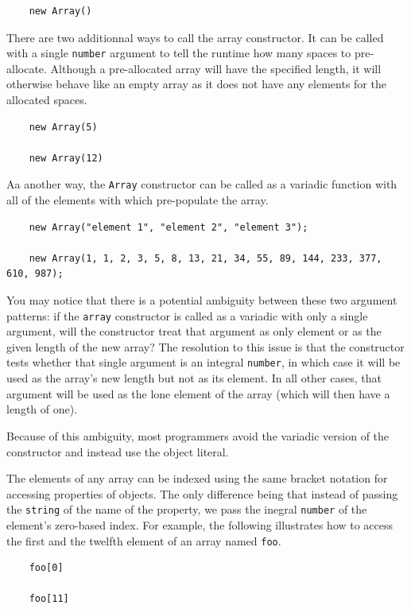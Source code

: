 \documentclass[11pt,letter]{book}
\begin{document}
    \begin{verbatim}
    new Array()
    \end{verbatim}
    
    There are two additionnal ways to call the array constructor. It can be called with a single 
    \texttt{number} argument to tell the runtime how many spaces to pre-allocate. Although a 
    pre-allocated array will have the specified length, it will otherwise behave like an empty array
    as it does not have any elements for the allocated spaces.
    
    \begin{verbatim}
    new Array(5)
    
    new Array(12)
    \end{verbatim}
    
    Aa another way, the \texttt{Array} constructor can be called as a variadic function with all of 
    the elements with which pre-populate the array.
    
    \begin{verbatim}
    new Array("element 1", "element 2", "element 3");
    
    new Array(1, 1, 2, 3, 5, 8, 13, 21, 34, 55, 89, 144, 233, 377, 610, 987);
    \end{verbatim}
    
    You may notice that there is a potential ambiguity between these two argument patterns: if the
    \texttt{array} constructor is called as a variadic with only a single argument, will the
    constructor treat that argument as only element or as the given length of the new array? The 
    resolution to this issue is that the constructor tests whether that single argument is an 
    integral \texttt{number}, in which case it will be used as the array's new length but not as its 
    element. In all other cases, that argument will be used as the lone element of the array (which 
    will then have a length of one). 
    
    Because of this ambiguity, most programmers avoid the variadic version of the constructor and 
    instead use the object literal.
    
    The elements of any array can be indexed using the same bracket notation for accessing 
    properties of objects. The only difference being that instead of passing the \texttt{string} of 
    the name of the property, we pass the inegral \texttt{number} of the element's zero-based index.
    For example, the following illustrates how to access the first and the twelfth element of an 
    array named \texttt{foo}.
    
    \begin{verbatim}
    foo[0]
    
    foo[11]
    \end{verbatim}
    
    
    
\end{document}
